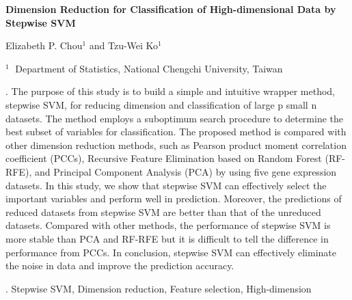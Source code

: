 \documentclass[12pt]{article}
\begin{document}
\begin{flushleft}


{\LARGE\bf Dimension Reduction for Classification of High-dimensional Data by Stepwise SVM }


\vspace{1.0cm}

Elizabeth P. Chou$^1$ and Tzu-Wei Ko$^1$

\begin{description}

\item $^1 \;$ Department of Statistics, National Chengchi University, Taiwan 


\end{description}

\end{flushleft}


\vspace{0.75cm}

. The purpose of this study is to build a simple and intuitive wrapper method, stepwise SVM, for reducing dimension and classification of large p small n datasets. The method employs a suboptimum search procedure to determine the best subset of variables for classification. The proposed method is compared with other dimension reduction methods, such as Pearson product moment correlation coefficient (PCCs), Recursive Feature Elimination based on Random Forest (RF-RFE), and Principal Component Analysis (PCA) by using five gene expression datasets. In this study, we show that stepwise SVM can effectively select the important variables and perform well in prediction. Moreover, the predictions of reduced datasets from stepwise SVM are better than that of the unreduced datasets. Compared with other methods, the performance of stepwise SVM is more stable than PCA and RF-RFE but it is difficult to tell the difference in performance from PCCs. In conclusion, stepwise SVM can effectively eliminate the noise in data and improve the prediction accuracy.

\vskip 2mm

.
Stepwise SVM, Dimension reduction, Feature selection, High-dimension
\end{document}
